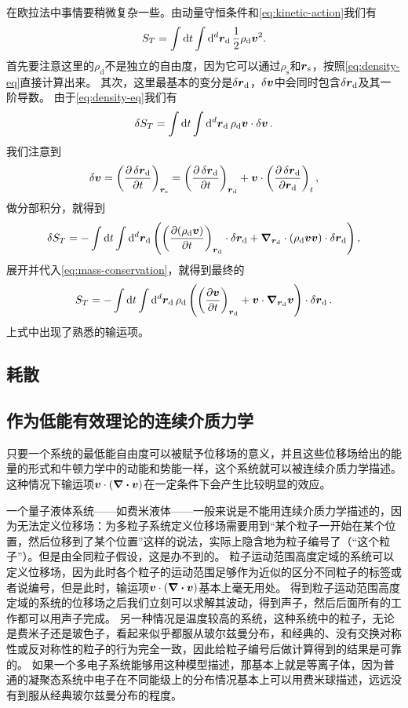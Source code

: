 \documentclass[hyperref, UTF8, a4paper]{ctexart}
\begin{document}
在欧拉法中事情要稍微复杂一些。由动量守恒条件和\eqref{eq:kinetic-action}我们有
\begin{equation}
    S_T = \int \dd{t} \int \dd[d]{\vb*{r}_\text{d}} \frac{1}{2} \rho_\text{d} \vb*{v}^2.
\end{equation}
首先要注意这里的$\rho_\text{d}$不是独立的自由度，因为它可以通过$\rho_\text{s}$和$\vb*{r}_\text{s}$，按照\eqref{eq:density-eq}直接计算出来。
其次，这里最基本的变分是$\var{\vb*{r}_\text{d}}$，$\var{\vb*{v}}$中会同时包含$\var{\vb*{r}_\text{d}}$及其一阶导数。
由于\eqref{eq:density-eq}我们有
\[
    \var{S_T} = \int \dd{t} \int \dd[d]{\vb*{r}_\text{d}} \rho_\text{d} \vb*{v} \cdot \var{\vb*{v}}.
\]
我们注意到
\[
    \var{\vb*{v}} = \left( \pdv{\var{\vb*{r}_\text{d}}}{t} \right)_{\vb*{r}_\text{s}} = \left( \pdv{\var{\vb*{r}_\text{d}}}{t} \right)_{\vb*{r}_\text{d}} + \vb*{v} \cdot \left(\pdv{\var{\vb*{r}_\text{d}}}{\vb*{r}_\text{d}}\right)_t,
\]
做分部积分，就得到
\[
    \var{S_T} = - \int \dd{t} \int \dd[d]{\vb*{r}_\text{d}} \left( \left(\pdv{(\rho_\text{d} \vb*{v})}{t}\right)_{\vb*{r}_\text{d}} \cdot \var{\vb*{r}_\text{d}} + \grad_{\vb*{r}_\text{d}} \cdot (\rho_\text{d} \vb*{v} \vb*{v}) \cdot \var{\vb*{r}_\text{d}} \right),
\]
展开并代入\eqref{eq:mass-conservation}，就得到最终的
\begin{equation}
    S_T = - \int \dd{t} \int \dd[d]{\vb*{r}_\text{d}}  \rho_\text{d} \left( \left(\pdv{\vb*{v}}{t}\right)_{\vb*{r}_\text{d}} + \vb*{v} \cdot \grad_{\vb*{r}_\text{d}} \vb*{v} \right) \cdot \var{\vb*{r}_\text{d}}.
\end{equation}
上式中出现了熟悉的输运项。

\subsection{耗散}

\subsection{作为低能有效理论的连续介质力学}

只要一个系统的最低能自由度可以被赋予位移场的意义，并且这些位移场给出的能量的形式和牛顿力学中的动能和势能一样，这个系统就可以被连续介质力学描述。
这种情况下输运项$\vb*{v} \cdot (\div{\vb*{v}})$在一定条件下会产生比较明显的效应。

一个量子液体系统——如费米液体——一般来说是不能用连续介质力学描述的，因为无法定义位移场：为多粒子系统定义位移场需要用到“某个粒子一开始在某个位置，然后位移到了某个位置”这样的说法，实际上隐含地为粒子编号了（“这个粒子”）。但是由全同粒子假设，这是办不到的。
粒子运动范围高度定域的系统可以定义位移场，因为此时各个粒子的运动范围足够作为近似的区分不同粒子的标签或者说编号，但是此时，输运项$\vb*{v} \cdot (\div{\vb*{v}})$基本上毫无用处。
得到粒子运动范围高度定域的系统的位移场之后我们立刻可以求解其波动，得到声子，然后后面所有的工作都可以用声子完成。
另一种情况是温度较高的系统，这种系统中的粒子，无论是费米子还是玻色子，看起来似乎都服从玻尔兹曼分布，和经典的、没有交换对称性或反对称性的粒子的行为完全一致，因此给粒子编号后做计算得到的结果是可靠的。
如果一个多电子系统能够用这种模型描述，那基本上就是等离子体，因为普通的凝聚态系统中电子在不同能级上的分布情况基本上可以用费米球描述，远远没有到服从经典玻尔兹曼分布的程度。
\end{document}

